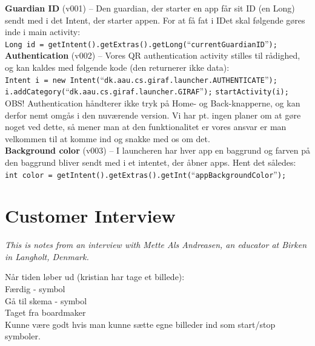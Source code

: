 \textbf{Guardian ID} (v001) -- Den guardian, der starter en app f\aa{}r sit ID (en Long) sendt med i det Intent, der starter appen. For at f\aa{} fat i IDet skal f\o{}lgende g\o{}res inde i main activity:\\

	\verb+Long id = getIntent().getExtras().getLong(+``\verb+currentGuardianID+''\verb+);+\\
	
\textbf{Authentication} (v002) -- Vores QR authentication activity stilles til r\aa{}dighed, og kan kaldes med f\o{}lgende kode (den returnerer ikke data):\\

	\verb+Intent i = new Intent(+``\verb+dk.aau.cs.giraf.launcher.AUTHENTICATE+''\verb+);+
	\verb+i.addCategory(+``\verb+dk.aau.cs.giraf.launcher.GIRAF+''\verb+);+
	\verb+startActivity(i);+\\
	
OBS! Authentication h\aa{}ndterer ikke tryk p\aa{} Home- og Back-knapperne, og kan derfor nemt omg\aa{}s i den nuv\ae{}rende version. Vi har pt. ingen planer om at g\o{}re noget ved dette, s\aa{} mener man at den funktionalitet er vores ansvar er man velkommen til at komme ind og snakke med os om det.\\

\textbf{Background color} (v003) -- I launcheren har hver app en baggrund og farven p\aa{} den baggrund bliver sendt med i et intentet, der \aa{}bner apps. Hent det s\aa{}ledes:\\

\verb+int color = getIntent().getExtras().getInt(+``\verb+appBackgroundColor+''\verb+);+

\chapter{Customer Interview}
\label{InterviewMette}
\textit{This is notes from an interview with Mette Als Andreasen, an educator at Birken in Langholt, Denmark.}

N\aa{}r tiden l\o{}ber ud (kristian har tage et billede):\\
F\ae{}rdig - symbol\\
G\aa{} til skema - symbol\\
Taget fra boardmaker\\

Kunne v\ae{}re godt hvis man kunne s\ae{}tte egne billeder ind som start/stop symboler.\\


